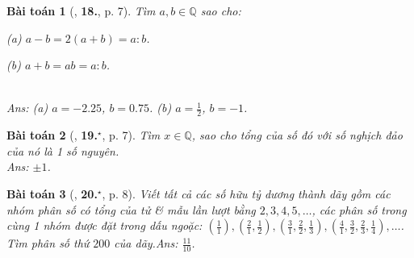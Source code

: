 \documentclass{article}
\numberwithin{equation}{section}
\newtheorem{baitoan}{Bài toán}
\begin{document}
\begin{baitoan}[\cite{Binh_Toan_7_tap_1}, \textbf{18.}, p. 7]
	Tìm $a,b\in\mathbb{Q}$ sao cho:
	\begin{enumerate*}
		\item[(a)] $a - b = 2(a + b) = a:b$.
		\item[(b)] $a + b = ab = a:b$.
	\end{enumerate*}\\\mbox{}\hfill\textsf{Ans:} (a) $a = -2.25$, $b = 0.75$. (b) $a = \frac{1}{2}$, $b = -1$.
\end{baitoan}

\begin{baitoan}[\cite{Binh_Toan_7_tap_1}, \textbf{19.}${}^\star$, p. 7]
	Tìm $x\in\mathbb{Q}$, sao cho tổng của số đó với số nghịch đảo của nó là 1 số nguyên.\\\mbox{}\hfill\textsf{Ans:} $\pm 1$.
\end{baitoan}

\begin{baitoan}[\cite{Binh_Toan_7_tap_1}, \textbf{20.}${}^\star$, p. 8]
	Viết tất cả các số hữu tỷ dương  thành dãy gồm các nhóm phân số có tổng của tử \& mẫu lần lượt bằng $2,3,4,5,\ldots$, các phân số trong cùng 1 nhóm được đặt trong dấu ngoặc: $\left(\frac{1}{1}\right),\left(\frac{2}{1},\frac{1}{2}\right),\left(\frac{3}{1},\frac{2}{2},\frac{1}{3}\right),\left(\frac{4}{1},\frac{3}{2},\frac{2}{3},\frac{1}{4}\right),\ldots$. Tìm phân số thứ $200$ của dãy.\hfill\textsf{Ans:} $\frac{11}{10}$.
\end{baitoan}

\end{document}
